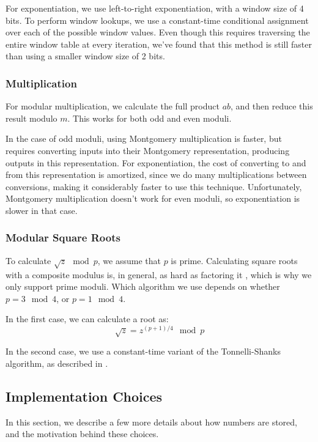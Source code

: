 \documentclass[11pt, a4paper]{article} %
\begin{document}
{For exponentiation, we use left-to-right exponentiation,
with a window size of 4 bits. To perform window lookups,
we use a constant-time conditional assignment
over each of the possible window values. Even though this requires traversing
the entire window table at every iteration, we've found that this method
is still faster than using a smaller window size of 2 bits.

\subsubsection{Multiplication}

For modular multiplication, we calculate the full product
$ab$, and then reduce this result modulo $m$. This works
for both odd and even moduli.

In the case of odd moduli, using Montgomery multiplication
\cite{kaya_koc_analyzing_1996-1, pornin_bearssl_2020-1} is
faster, but requires converting inputs into their Montgomery
representation, producing outputs in this representation.
For exponentiation,
the cost of converting to and from this representation is amortized,
since we do many multiplications between conversions, making
it considerably faster to use this technique. Unfortunately,
Montgomery multiplication doesn't work for even moduli,
so exponentiation is slower in that case.

\subsubsection{Modular Square Roots}

To calculate $\sqrt{z} \mod p$, we assume that $p$ is prime.
Calculating square roots with a composite modulus is,
in general, as hard
as factoring it \cite{buhler_basic_2008}, which is why
we only support prime moduli.
Which algorithm we use depends on whether $p = 3 \mod 4$,
or $p = 1 \mod 4$.

In the first case, we can calculate a root as:
$$
\sqrt{z} = z^{(p + 1) / 4} \mod p
$$

In the second case, we use a constant-time variant
of the Tonnelli-Shanks algorithm, as described in 
\cite{wahby_hashing_nodate}.

\subsection{Implementation Choices}

In this section, we describe a few more details
about how numbers are stored, and the motivation behind
these choices.

}
\end{document}
